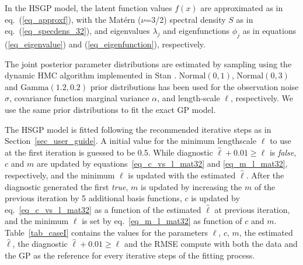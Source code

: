 In the HSGP model, the latent function values $f(x)$ are approximated as in eq.~(\ref{eq_approxf}), with the Mat{\'e}rn ($\nu$=3/2) spectral density $S$ as in eq.~(\ref{eq_specdens_32}), and eigenvalues $\lambda_j$ and eigenfunctions $\phi_j$ as in equations (\ref{eq_eigenvalue}) and (\ref{eq_eigenfunction}), respectively.  %

The joint posterior parameter distributions are estimated by sampling using the dynamic HMC algorithm implemented in Stan \citep{StanTeam:2021}. $\mathrm{Normal}(0,1)$, \linebreak $\mathrm{Normal}(0,3)$ and $\mathrm{Gamma}(1.2,0.2)$ prior distributions has been used for the observation noise $\sigma$, covariance function marginal variance $\alpha$, and length-scale $\ell$, respectively. We use the same prior distributions to fit the exact GP model.

The HSGP model is fitted following the recommended iterative steps as in Section~\ref{sec_user_guide}. A initial value for the minimum lengthscale $\ell$ to use at the first iteration is guessed to be 0.5. While diagnostic $\hat{\ell} + 0.01 \geq \ell$ is \textit{false}, $c$ and $m$ are updated by equations~\eqref{eq_c_vs_l_mat32} and \eqref{eq_m_l_mat32}, respectively, and the minimum $\ell$ is updated with the estimated $\hat{\ell}$. After the diagnostic generated the first \textit{true}, $m$ is updated by increasing the $m$ of the previous iteration by 5 additional basis functions, $c$ is updated by eq.~\eqref{eq_c_vs_l_mat32} as a function of the estimated $\hat{\ell}$ at previous iteration, and the minimum $\ell$ is set by eq.~\eqref{eq_m_l_mat32} as function of $c$ and $m$. Table~\ref{tab_caseI} contains the values for the parameters $\ell$, $c$, $m$, the estimated $\hat{\ell}$, the diagnostic $\hat{\ell} + 0.01 \geq \ell$ and the RMSE compute with both the data and the GP as the reference for every iterative steps of the fitting process.

